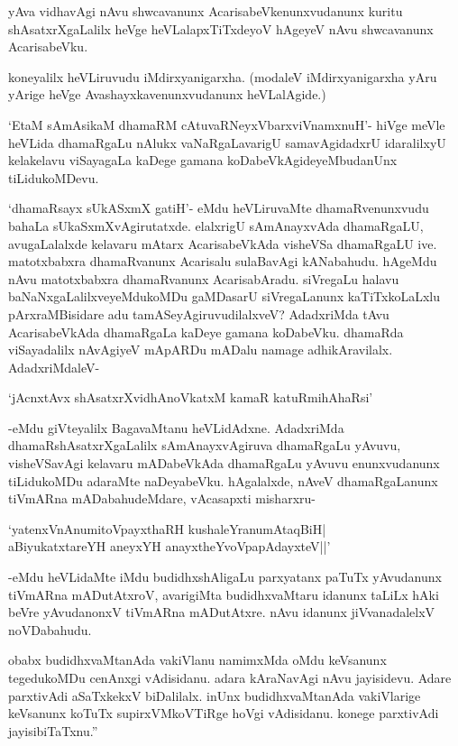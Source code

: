 yAva vidhavAgi nAvu shwcavanunx AcarisabeVkenunxvudanunx kuritu shAsatxrXgaLalilx heVge heVLalapxTiTxdeyoV hAgeyeV nAvu shwcavanunx AcarisabeVku.

koneyalilx heVLiruvudu iMdirxyanigarxha. (modaleV iMdirxyanigarxha yAru yArige heVge Avashayxkavenunxvudanunx heVLalAgide.) 

`EtaM sAmAsikaM dhamaRM cAtuvaRNeyxV\s barxviVnamxnuH'- hiVge meVle heVLida dhamaRgaLu nAlukx vaNaRgaLavarigU samavAgidadxrU idaralilxyU kelakelavu viSayagaLa kaDege gamana koDabeVkAgideyeMbudanUnx tiLidukoMDevu.

`dhamaRsayx sUkASxmX gatiH'- eMdu heVLiruvaMte dhamaRvenunxvudu bahaLa sUkaSxmXvAgirutatxde. elalxrigU sAmAnayxvAda dhamaRgaLU, avugaLalalxde kelavaru mAtarx AcarisabeVkAda visheVSa dhamaRgaLU ive. matotxbabxra dhamaRvanunx Acarisalu sulaBavAgi kANabahudu. hAgeMdu nAvu matotxbabxra dhamaRvanunx AcarisabAradu. siVregaLu halavu baNaNxgaLalilxveyeMdukoMDu gaMDasarU siVregaLanunx kaTiTxkoLaLxlu pArxraMBisidare adu tamASeyAgiruvudilalxveV? AdadxriMda tAvu AcarisabeVkAda dhamaRgaLa kaDeye gamana koDabeVku. dhamaRda viSayadalilx nAvAgiyeV mApARDu mADalu namage adhikAravilalx. AdadxriMdaleV-

\begin{shloka}
`jAcnxtAvx shAsatxrXvidhAnoVkatxM kamaR katuRmihAhaRsi'
\end{shloka} 

-eMdu giVteyalilx BagavaMtanu heVLidAdxne. AdadxriMda dhamaRshAsatxrXgaLalilx sAmAnayxvAgiruva dhamaRgaLu yAvuvu, visheVSavAgi kelavaru mADabeVkAda dhamaRgaLu yAvuvu enunxvudanunx tiLidukoMDu adaraMte naDeyabeVku. hAgalalxde, nAveV dhamaRgaLanunx tiVmARna mADabahudeMdare, vAcasapxti misharxru-

\begin{shloka}
`yatenxVnAnumitoVpayxthaRH kushaleYranumAtaqBiH|\\
aBiyukatxtareYH aneyxYH anayxtheYvoVpapAdayxteV||'
\end{shloka}

-eMdu heVLidaMte iMdu budidhxshAligaLu parxyatanx paTuTx yAvudanunx tiVmARna mADutAtxroV, avarigiMta budidhxvaMtaru idanunx taLiLx hAki beVre yAvudanonxV tiVmARna mADutAtxre. nAvu idanunx jiVvanadalelxV noVDabahudu.

obabx budidhxvaMtanAda vakiVlanu namimxMda oMdu keVsanunx tegedukoMDu cenAnxgi vAdisidanu. adara kAraNavAgi nAvu jayisidevu. Adare parxtivAdi aSaTxkekxV biDalilalx. inUnx budidhxvaMtanAda vakiVlarige keVsanunx koTuTx supirxVMkoVTiRge hoVgi vAdisidanu. konege parxtivAdi jayisibiTaTxnu.''


